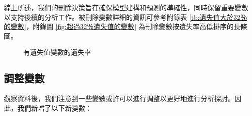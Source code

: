 \documentclass[12pt, a4paper]{article}
\begin{document}
綜上所述，我們的刪除決策旨在確保模型建構和預測的準確性，同時保留重要變數以支持後續的分析工作。被刪除變數詳細的資訊可參考附錄表 \ref{tb:遺失值大於32％的變數}，附錄圖 \ref{fig:超過32％遺失值的變數} 為刪除變數按遺失率高低排序的長條圖。

\begin{figure}[h]
    \caption{有遺失值變數的遺失率}
    \label{fig:有遺失值變數的遺失率}
\end{figure}

\subsection{調整變數}

觀察資料後，我們注意到一些變數或許可以進行調整以更好地進行分析探討。因此，我們新增了以下新變數：
\end{document}
